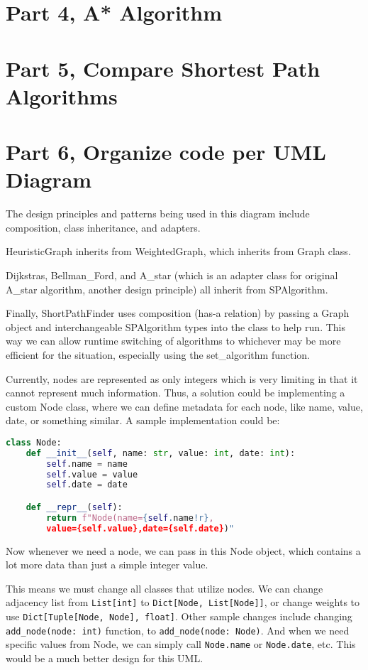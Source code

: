 \documentclass{article}
\begin{document}
\begin{onehalfspace}
\section*{Part 4, A* Algorithm}
\newpage

\section*{Part 5, Compare Shortest Path Algorithms}
\newpage

\section*{Part 6, Organize code per UML Diagram}

The design principles and patterns being used in this diagram include composition, class inheritance, and adapters. 

HeuristicGraph inherits from WeightedGraph, which inherits from Graph class.

Dijkstras, Bellman\_Ford, and A\_star (which is an adapter class for original A\_star algorithm, another design principle) all inherit from SPAlgorithm.

Finally, ShortPathFinder uses composition (has-a relation) by passing a Graph object and interchangeable SPAlgorithm types into the class to help run. This way we can allow runtime switching of algorithms to whichever may be more efficient for the situation, especially using the set\_algorithm function.

Currently, nodes are represented as only integers which is very limiting in that it cannot represent much information. Thus, a solution could be implementing a custom Node class, where we can define metadata for each node, like name, value, date, or something similar. A sample implementation could be:

\begin{lstlisting}[language=Python]
class Node:
    def __init__(self, name: str, value: int, date: int):
        self.name = name
        self.value = value
        self.date = date

    def __repr__(self):
        return f"Node(name={self.name!r},
        value={self.value},date={self.date})"
\end{lstlisting}

Now whenever we need a node, we can pass in this Node object, which contains a lot more data than just a simple integer value.

This means we must change all classes that utilize nodes. We can change adjacency list from \texttt{List[int]} to \texttt{Dict[Node, List[Node]]}, or change weights to use \texttt{Dict[Tuple[Node, Node], float]}. Other sample changes include changing \texttt{add\_node(node: int)} function, to \texttt{add\_node(node: Node)}. And when we need specific values from Node, we can simply call \texttt{Node.name} or \texttt{Node.date}, etc. This would be a much better design for this UML.

\end{onehalfspace}
\end{document}
